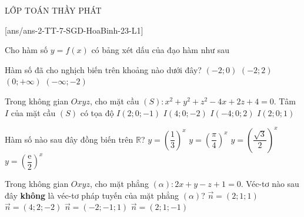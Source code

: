 \begin{name}
	{\tenchude}{\tendethi}{LỚP TOÁN THẦY PHÁT}{\thoigian}
\end{name}
\setcounter{ex}{0}\setcounter{bt}{0}
[ans/ans-2-TT-7-SGD-HoaBinh-23-L1]

\begin{ex}%
	Cho hàm số $y=f(x)$ có bảng xét dấu của đạo hàm như sau
	\begin{center}
	\end{center}
Hàm số đã cho nghịch biến trên khoảng nào dưới đây?
	\choice
	{\True $(-2;0)$}
	{$(-2;2)$}
	{$(0;+\infty)$}
	{$(-\infty;-2)$}

\end{ex}
\begin{ex}%
Trong không gian $Oxyz$, cho mặt cầu $(S) \colon x^2+y^2+z^2-4x+2z+4=0$. Tâm $I$ của mặt cầu $(S)$ có tọa độ
	\choice
{\True $I(2;0;-1)$}
{ $I(4;0;-2)$}
{$I(-4;0;2)$ }
{$I(2;0;1)$}
\end{ex}
\begin{ex}%
	Hàm số nào sau đây đồng biến trên $\mathbb{R}$?
	\choice
	{$y=\left(\dfrac{1}{3}\right)^x$}
	{$y=\left(\dfrac{\pi}{4}\right)^x$}
	{$y=\left(\dfrac{\sqrt{3}}{2}\right)^x$}
	{\True $y=\left(\dfrac{\mathrm{e}}{2}\right)^x$}
\end{ex}
\begin{ex}%
	Trong không gian $Oxyz$, cho mặt phẳng $(\alpha)\colon 2x+y-z+1=0$. Véc-tơ nào sau đây \textbf{không} là véc-tơ pháp tuyến của mặt phẳng $(\alpha)$?
	\choice
	{\True $\overrightarrow{n}=(2;1;1)$}
	{$\overrightarrow{n}=(4;2;-2)$}
	{$\overrightarrow{n}=(-2;-1;1)$}
	{$\overrightarrow{n}=(2;1;-1)$}
\end{ex}
